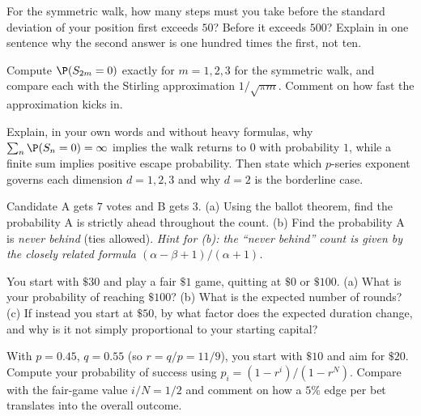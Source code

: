 \begin{exercise}
\label{ch26:ex-sqrtlaw}
For the symmetric walk, how many steps must you take before the standard
deviation of your position first exceeds $50$? Before it exceeds $500$? Explain
in one sentence why the second answer is one hundred times the first, not ten.
\end{exercise}

\begin{exercise}
\label{ch26:ex-return}
Compute $\P(S_{2m} = 0)$ exactly for $m = 1, 2, 3$ for the symmetric walk, and
compare each with the Stirling approximation $1/\sqrt{\pi m}$. Comment on how
fast the approximation kicks in.
\end{exercise}

\begin{exercise}
\label{ch26:ex-rectrans}
Explain, in your own words and without heavy formulas, why
$\sum_n \P(S_n = 0) = \infty$ implies the walk returns to $0$ with probability
$1$, while a finite sum implies positive escape probability. Then state which
$p$-series exponent governs each dimension $d = 1, 2, 3$ and why $d = 2$ is the
borderline case.
\end{exercise}

\begin{exercise}
\label{ch26:ex-ballot}
Candidate A gets $7$ votes and B gets $3$. (a) Using the ballot theorem, find
the probability A is strictly ahead throughout the count. (b) Find the
probability A is \emph{never behind} (ties allowed). \emph{Hint for (b): the
``never behind'' count is given by the closely related formula
$(\alpha - \beta + 1)/(\alpha + 1)$.}
\end{exercise}

\begin{exercise}
\label{ch26:ex-ruinfair}
You start with $\$30$ and play a fair $\$1$ game, quitting at $\$0$ or
$\$100$. (a) What is your probability of reaching $\$100$? (b) What is the
expected number of rounds? (c) If instead you start at $\$50$, by what factor
does the expected duration change, and why is it not simply proportional to
your starting capital?
\end{exercise}

\begin{exercise}
\label{ch26:ex-ruinbiased}
With $p = 0.45$, $q = 0.55$ (so $r = q/p = 11/9$), you start with $\$10$ and
aim for $\$20$. Compute your probability of success using
$p_i = (1 - r^i)/(1 - r^N)$. Compare with the fair-game value $i/N = 1/2$ and
comment on how a $5\%$ edge per bet translates into the overall outcome.
\end{exercise}

